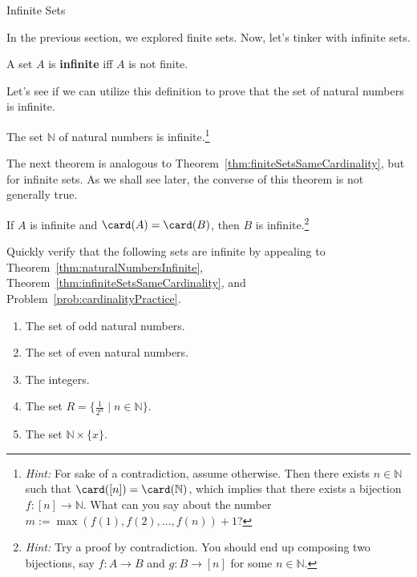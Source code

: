 \begin{section}{Infinite Sets}

In the previous section, we explored finite sets.  Now, let's tinker with infinite sets.

\begin{definition}\label{def:infiniteSet}
A set $A$ is \textbf{infinite} iff $A$ is not finite.
\end{definition}

Let's see if we can utilize this definition to prove that the set of natural numbers is infinite.

\begin{theorem}\label{thm:naturalNumbersInfinite}
The set $\mathbb{N}$ of natural numbers is infinite.\footnote{\emph{Hint:} For sake of a contradiction, assume otherwise.  Then there exists $n\in\mathbb{N}$ such that $\card([n])=\card(\mathbb{N})$, which implies that there exists a bijection $f:[n]\to \mathbb{N}$. What can you say about the number $m:=\max(f(1),f(2),\ldots,f(n))+1$?}
\end{theorem}

The next theorem is analogous to Theorem~\ref{thm:finiteSetsSameCardinality}, but for infinite sets. As we shall see later, the converse of this theorem is not generally true.

\begin{theorem}\label{thm:infiniteSetsSameCardinality}
If $A$ is infinite and $\card(A)=\card(B)$, then $B$ is infinite.\footnote{\emph{Hint:} Try a proof by contradiction. You should end up composing two bijections, say $f:A\to B$ and $g:B\to [n]$ for some $n\in\mathbb{N}$.}
\end{theorem}

\begin{exercise}\label{exer:someInfiniteSets}
Quickly verify that the following sets are infinite by appealing to Theorem~\ref{thm:naturalNumbersInfinite}, Theorem~\ref{thm:infiniteSetsSameCardinality}, and Problem~\ref{prob:cardinalityPractice}.
\begin{enumerate}[label=\textrm{(\alph*)}]
\item The set of odd natural numbers.
\item The set of even natural numbers.
\item The integers.
\item The set $R=\{\frac{1}{2^n}\mid n\in \mathbb{N}\}$.
\item The set $\mathbb{N}\times \{x\}$.
\end{enumerate}
\end{exercise}


\end{section}
